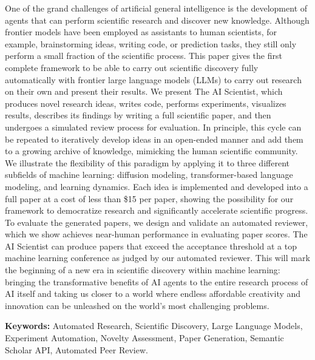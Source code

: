 \begin{justify}

\linespread{1}
\large One of the grand challenges of artificial general intelligence is the development of agents that can perform scientific research and discover new knowledge. Although frontier models have been employed as assistants to human scientists, for example, brainstorming ideas, writing code, or prediction tasks, they still only perform a small fraction of the scientific process. This paper gives the first complete framework to be able to carry out scientific discovery fully automatically with frontier large language models (LLMs) to carry out research on their own and present their results. We present The AI Scientist, which produces novel research ideas, writes code, performs experiments, visualizes results, describes its findings by writing a full scientific paper, and then undergoes a simulated review process for evaluation. In principle, this cycle can be repeated to iteratively develop ideas in an open-ended manner and add them to a growing archive of knowledge, mimicking the human scientific community. We illustrate the flexibility of this paradigm by applying it to three different subfields of machine learning: diffusion modeling, transformer-based language modeling, and learning dynamics. Each idea is implemented and developed into a full paper at a cost of less than \$15 per paper, showing the possibility for our framework to democratize research and significantly accelerate scientific progress. To evaluate the generated papers, we design and validate an automated reviewer, which we show achieves near-human performance in evaluating paper scores. The AI Scientist can produce papers that exceed the acceptance threshold at a top machine learning conference as judged by our automated reviewer. This will mark the beginning of a new era in scientific discovery within machine learning: bringing the transformative benefits of AI agents to the entire research process of AI itself and taking us closer to a world where endless affordable creativity and innovation can be unleashed on the world's most challenging problems.
\vspace{1cm}
\begin{justify}
  \textbf{Keywords:}  Automated Research, Scientific Discovery, Large Language Models, Experiment Automation, Novelty Assessment, Paper Generation, Semantic Scholar API, Automated Peer Review. 
\end{justify}
\end{justify}